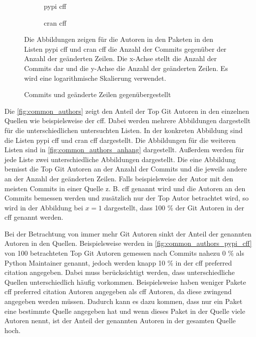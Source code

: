 \begin{figure}
    \begin{subfigure}{.5\textwidth}
        \centering
        
        \caption{\gls{pypi} \gls{cff}}
        \label{fig:commits_vs_changed_lines_pypi_cff}
    \end{subfigure}%
    \begin{subfigure}{.5\textwidth}
        \centering
        
        \caption{\gls{cran} \gls{cff}}
        \label{fig:commits_vs_changed_lines_cran_cff}
    \end{subfigure}
    \caption{Commits und geänderte Zeilen gegenübergestellt}
    \label{fig:commits_vs_changed_lines}
    \small
    \raggedright
    Die Abbildungen zeigen für die Autoren in den Paketen in den Listen \gls{pypi} \gls{cff} und \gls{cran} \gls{cff} die Anzahl der Commits gegenüber der Anzahl der geänderten Zeilen. Die x-Achse stellt die Anzahl der Commits dar und die y-Achse die Anzahl der geänderten Zeilen. Es wird eine logarithmische Skalierung verwendet.
\end{figure}

Die \autoref{fig:common_authors} zeigt den Anteil der Top Git Autoren in den einzelnen Quellen wie beispielsweise der \gls{cff}.
Dabei werden mehrere Abbildungen dargestellt für die unterschiedlichen untersuchten Listen.
In der konkreten Abbildung sind die Listen \gls{pypi} \gls{cff} und \gls{cran} \gls{cff} dargestellt.
Die Abbildungen für die weiteren Listen sind in \autoref{fig:common_authors_anhang} dargestellt.
Außerdem werden für jede Liste zwei unterschiedliche Abbildungen dargestellt.
Die eine Abbildung bemisst die Top Git Autoren an der Anzahl der Commits und die jeweils andere an der Anzahl der geänderten Zeilen.
Falls beispielsweise der Autor mit den meisten Commits in einer Quelle z. B. \gls{cff} genannt wird und die Autoren an den Commits bemessen werden und zusätzlich nur der Top Autor betrachtet wird, so wird in der Abbildung bei $x=1$ dargestellt, dass 100 \% der Git Autoren in der \gls{cff} genannt werden.

Bei der Betrachtung von immer mehr Git Autoren sinkt der Anteil der genannten Autoren in den Quellen.
Beispielsweise werden in \autoref{fig:common_authors_pypi_cff} von 100 betrachteten Top Git Autoren gemessen nach Commits nahezu 0 \% als Python Maintainer genannt, jedoch werden knapp 10 \% in der \gls{cff} preferred citation angegeben.
Dabei muss berücksichtigt werden, dass unterschiedliche Quellen unterschiedlich häufig vorkommen.
Beispielsweise haben weniger Pakete \gls{cff} preferred citation Autoren angegeben als \gls{cff} Autoren, da diese zwingend angegeben werden müssen.
Dadurch kann es dazu kommen, dass nur ein Paket eine bestimmte Quelle angegeben hat und wenn dieses Paket in der Quelle viele Autoren nennt, ist der Anteil der genannten Autoren in der gesamten Quelle hoch.

